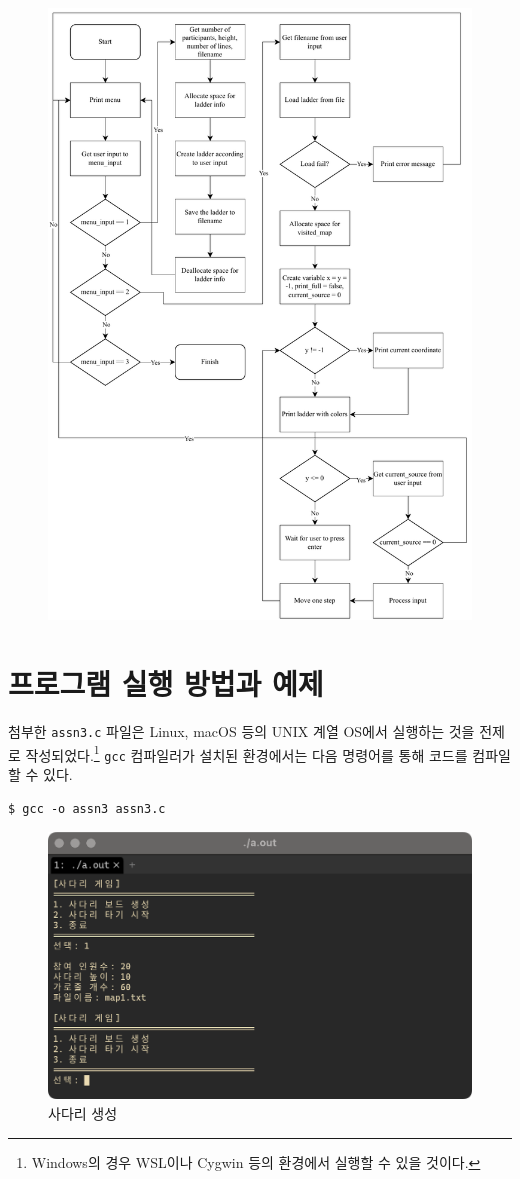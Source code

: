 \documentclass[titlepage]{article}
\begin{document}
\begin{figure}[H]
  \centering
  \includegraphics[width=0.9\linewidth]{flowchart.drawio.pdf}
\end{figure}

\section{프로그램 실행 방법과 예제}

첨부한 \texttt{assn3.c} 파일은 Linux, macOS 등의 UNIX 계열 OS에서 실행하는 것을 전제로 작성되었다.\footnote{Windows의 경우 WSL이나 Cygwin 등의 환경에서 실행할 수 있을 것이다.} \texttt{gcc} 컴파일러가 설치된 환경에서는 다음 명령어를 통해 코드를 컴파일할 수 있다.

\begin{lstlisting}
$ gcc -o assn3 assn3.c
\end{lstlisting}

\begin{figure}[H]
  \centering
  \includegraphics[width=0.7\linewidth]{generate.png}
  \caption{사다리 생성}
\end{figure}
\end{document}
